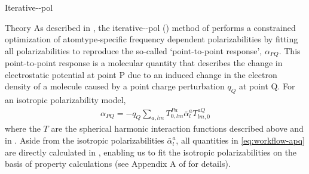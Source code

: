 \begin{subsubsection}{Iterative-\dma-pol}
\label{sec:workflow-jesse}

\begin{paragraph}{Theory}
As described in , the iterative-\dma-pol (\idma) method of
\citeauthor{McDaniel2013} performs a constrained optimization of
atomtype-specific frequency dependent polarizabilities by fitting all
polarizabilities to reproduce the so-called `point-to-point response',
$\alpha_{PQ}$. This point-to-point response is a
molecular quantity that
describes the change in electrostatic potential at point P due to an induced
change in the electron density of a molecule caused by a point charge
perturbation $q_Q$ at point Q. For an isotropic polarizability model,
%
\begin{align}
\label{eq:workflow-apq}
\alpha_{PQ} = -q_Q \sum\limits_{a,lm} T^{Pa}_{0,lm} \bar{\alpha}^a_l T^{aQ}_{lm,0}
\end{align}
%
where the $T$ are the spherical harmonic interaction functions described above and in
. Aside from the isotropic polarizabilities
$\bar{\alpha}^a_l$, all quantities in \cref{eq:workflow-apq} are directly
calculated in \camcasp, enabling us to fit
the isotropic polarizabilities on the basis of \camcasp property
calculations (see
Appendix A of  for details).
\end{paragraph}


\end{subsubsection}
